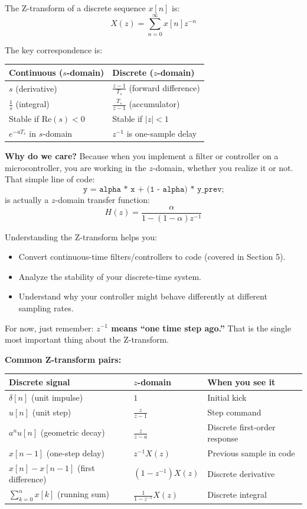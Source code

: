 The Z-transform of a discrete sequence $x[n]$ is:
\begin{equation}
X(z) = \sum_{n=0}^{\infty} x[n] z^{-n}
\end{equation}

The key correspondence is:
\begin{center}
\begin{tabular}{ll}
\toprule
\textbf{Continuous ($s$-domain)} & \textbf{Discrete ($z$-domain)} \\
\midrule
$s$ (derivative) & $\frac{z-1}{T_s}$ (forward difference) \\
$\frac{1}{s}$ (integral) & $\frac{T_s}{z-1}$ (accumulator) \\
Stable if $\text{Re}(s) < 0$ & Stable if $|z| < 1$ \\
$e^{-aT_s}$ in $s$-domain & $z^{-1}$ is one-sample delay \\
\bottomrule
\end{tabular}
\end{center}

\textbf{Why do we care?} Because when you implement a filter or controller on a microcontroller, you are working in the $z$-domain, whether you realize it or not. That simple line of code:
\[
\texttt{y = alpha * x + (1 - alpha) * y\_prev;}
\]
is actually a $z$-domain transfer function:
\[
H(z) = \frac{\alpha}{1 - (1-\alpha)z^{-1}}
\]

Understanding the Z-transform helps you:
\begin{itemize}
    \item Convert continuous-time filters/controllers to code (covered in Section 5).
    \item Analyze the stability of your discrete-time system.
    \item Understand why your controller might behave differently at different sampling rates.
\end{itemize}

For now, just remember: \textbf{$z^{-1}$ means ``one time step ago.''} That is the single most important thing about the Z-transform.

\textbf{Common Z-transform pairs:}

\begin{center}
\begin{tabular}{lll}
\toprule
\textbf{Discrete signal} & \textbf{$z$-domain} & \textbf{When you see it} \\
\midrule
$\delta[n]$ (unit impulse) & $1$ & Initial kick \\
$u[n]$ (unit step) & $\frac{z}{z-1}$ & Step command \\
$a^n u[n]$ (geometric decay) & $\frac{z}{z-a}$ & Discrete first-order response \\
$x[n-1]$ (one-step delay) & $z^{-1}X(z)$ & Previous sample in code \\
$x[n] - x[n-1]$ (first difference) & $(1 - z^{-1})X(z)$ & Discrete derivative \\
$\sum_{k=0}^{n} x[k]$ (running sum) & $\frac{1}{1 - z^{-1}}X(z)$ & Discrete integral \\
\bottomrule
\end{tabular}
\end{center}

